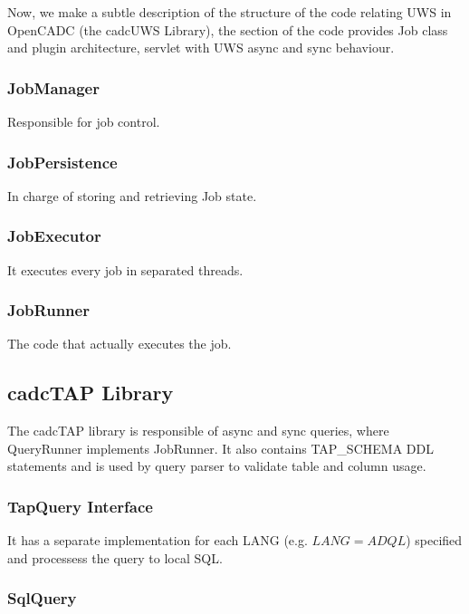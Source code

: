Now, we make a subtle description of the structure of the code relating UWS in OpenCADC (the cadcUWS Library), the section of the code provides Job class and plugin architecture, servlet with UWS async and sync behaviour.

\subsubsection{JobManager}

Responsible for job control.

\subsubsection{JobPersistence}

In charge of storing and retrieving Job state.

\subsubsection{JobExecutor}

It executes every job in separated threads.

\subsubsection{JobRunner}

The code that actually executes the job.


\subsection{cadcTAP Library}

The cadcTAP library is responsible of async and sync queries, where QueryRunner implements JobRunner. It also contains TAP\_SCHEMA DDL statements and is used by query parser to validate table and column usage.

\subsubsection{TapQuery Interface}

It has a separate implementation for each LANG (e.g. $LANG = ADQL$) specified and processess the query to local SQL.

\subsubsection{SqlQuery}

